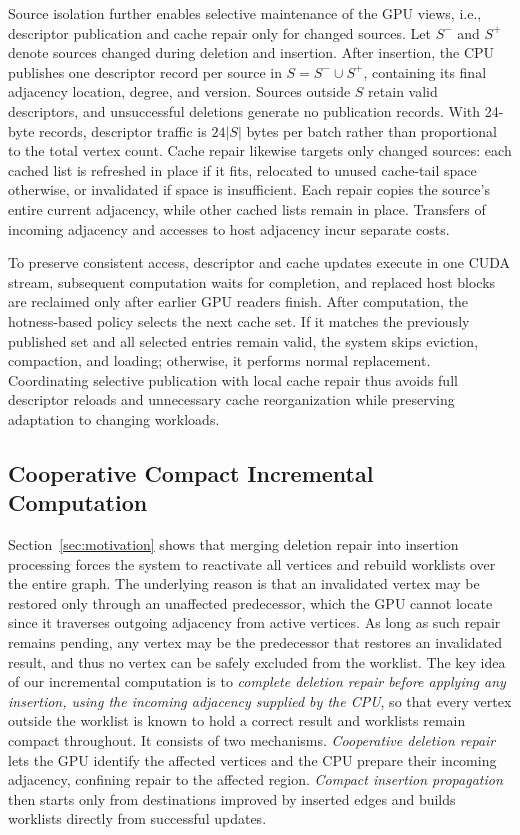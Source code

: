 Source isolation further enables selective maintenance of the GPU views, i.e., descriptor publication and cache repair only for changed sources. Let $S^-$ and $S^+$ denote sources changed during deletion and insertion. After insertion, the CPU publishes one descriptor record per source in $S=S^-\cup S^+$, containing its final adjacency location, degree, and version. Sources outside $S$ retain valid descriptors, and unsuccessful deletions generate no publication records. With 24-byte records, descriptor traffic is $24|S|$ bytes per batch rather than proportional to the total vertex count. Cache repair likewise targets only changed sources: each cached list is refreshed in place if it fits, relocated to unused cache-tail space otherwise, or invalidated if space is insufficient. Each repair copies the source's entire current adjacency, while other cached lists remain in place. Transfers of incoming adjacency and accesses to host adjacency incur separate costs.

To preserve consistent access, descriptor and cache updates execute in one CUDA stream, subsequent computation waits for completion, and replaced host blocks are reclaimed only after earlier GPU readers finish. After computation, the hotness-based policy selects the next cache set. If it matches the previously published set and all selected entries remain valid, the system skips eviction, compaction, and loading; otherwise, it performs normal replacement. Coordinating selective publication with local cache repair thus avoids full descriptor reloads and unnecessary cache reorganization while preserving adaptation to changing workloads.

\subsection{Cooperative Compact Incremental Computation}
\label{sec:incremental-computation}
Section~\ref{sec:motivation} shows that merging deletion repair into insertion processing forces the system to reactivate all vertices and rebuild worklists over the entire graph. The underlying reason is that an invalidated vertex may be restored only through an unaffected predecessor, which the GPU cannot locate since it traverses outgoing adjacency from active vertices. As long as such repair remains pending, any vertex may be the predecessor that restores an invalidated result, and thus no vertex can be safely excluded from the worklist. The key idea of our incremental computation is to \textit{complete deletion repair before applying any insertion, using the incoming adjacency supplied by the CPU}, so that every vertex outside the worklist is known to hold a correct result and worklists remain compact throughout. It consists of two mechanisms. \textit{Cooperative deletion repair} lets the GPU identify the affected vertices and the CPU prepare their incoming adjacency, confining repair to the affected region. \textit{Compact insertion propagation} then starts only from destinations improved by inserted edges and builds worklists directly from successful updates.

